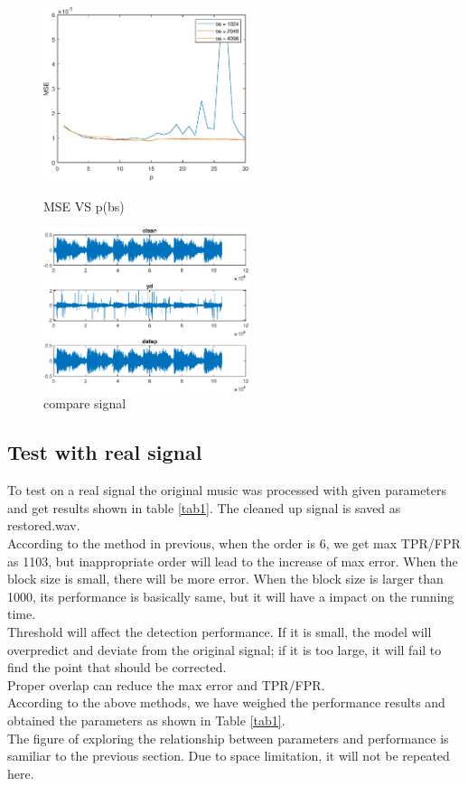 \documentclass[11pt, a4paper]{article}
\begin{document}
\begin{figure}[h]
	\centering

	\begin{minipage}{0.48\textwidth}
		\centering
		\includegraphics[width=6cm]{fig/fig8}
		\caption{MSE VS p(bs)}
		\label{fig8}
	\end{minipage}
	\begin{minipage}{0.48\textwidth}
		\centering
		\includegraphics[width=6cm]{fig/fig9v2}
		\caption{compare signal}
		\label{fig9}
	\end{minipage}
\end{figure}


\subsection{Test with real signal}
To test on a real signal the original music was processed with given parameters and get results shown in table \ref{tab1}. The cleaned up signal is saved as restored.wav.\\
According to the method in previous, when the order is 6, we get max TPR/FPR as 1103, but inappropriate order will lead to the increase of max error.
When the block size is small, there will be more error. When the block size is larger than 1000, its performance is basically same, but it will have a impact on the running time.\\
Threshold will affect the detection performance. If it is small, the model will overpredict and deviate from the original signal; if it is too large, it will fail to find the point that should be corrected.\\
Proper overlap can reduce the max error and TPR/FPR.\\
According to the above methods, we have weighed the performance results and obtained the parameters as shown in Table \ref{tab1}.\\
The figure of exploring the relationship between parameters and performance is samiliar to the previous section. Due to space limitation, it will not be repeated here.\\
\end{document}
